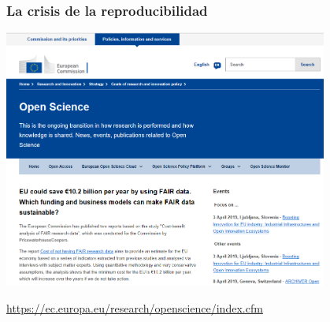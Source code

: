 \documentclass[9pt]{beamer}
\begin{document}
\begin{frame}
  \frametitle{La crisis de la reproducibilidad}
    \begin{overlayarea}{\textwidth}{\textheight}
     \begin{center}
    \includegraphics[width=0.8\textwidth]{images/open_science_EU}
  \end{center}\vspace{-0.5cm}
\hfill {\scriptsize \href{https://ec.europa.eu/research/openscience/index.cfm}{https://ec.europa.eu/research/openscience/index.cfm}}
  \begin{center}
    
\end{center}
\end{overlayarea}
\end{frame}
\end{document}
